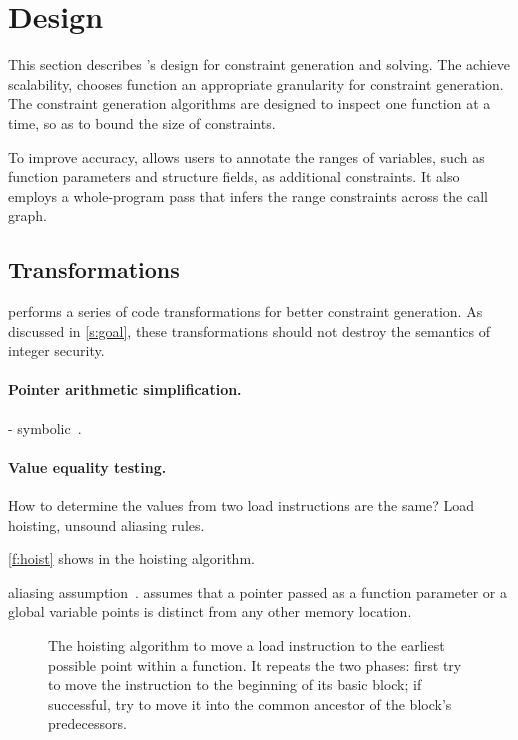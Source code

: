 \section{Design}
\label{s:gen}

This section describes \sys's design for constraint generation and
solving.  The achieve scalability, \sys chooses function an appropriate
granularity for constraint generation.  The constraint generation
algorithms are designed to inspect one function at a time, so as
to bound the size of constraints.

To improve accuracy, \sys allows users to annotate the ranges of
variables, such as function parameters and structure fields, as
additional constraints. It also employs a whole-program pass that
infers the range constraints across the call graph.

\subsection{Transformations}

\sys performs a series of code transformations for better constraint
generation.  As discussed in \autoref{s:goal}, these transformations
should not destroy the semantics of integer security.

\paragraph{Pointer arithmetic simplification.}
- symbolic~\cite{engelen:symbolic}.

\paragraph{Value equality testing.}
How to determine the values from two load instructions
are the same? Load hoisting, unsound aliasing rules.

\autoref{f:hoist} shows in the hoisting algorithm.

aliasing assumption~\cite{livshits:ipssa}.
\sys assumes that a pointer passed as a function parameter or a
global variable points is distinct from any other memory location.


\begin{figure}
\small

\caption{The hoisting algorithm to move a load instruction to the
earliest possible point within a function.  It repeats the two
phases: first try to move the instruction to the beginning of its
basic block; if successful, try to move it into the common ancestor
of the block's predecessors.}
\label{f:hoist}
\end{figure}

